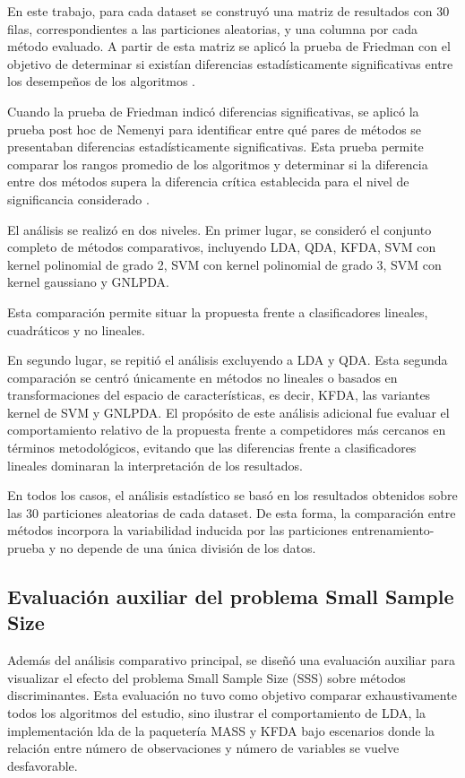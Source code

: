 En este trabajo, para cada dataset se construyó una matriz de resultados con 30 filas, correspondientes a las particiones aleatorias, y una columna por cada método evaluado. A partir de esta matriz se aplicó la prueba de Friedman con el objetivo de determinar si existían diferencias estadísticamente significativas entre los desempeños de los algoritmos \cite{pereira2015overview}.

Cuando la prueba de Friedman indicó diferencias significativas, se aplicó la prueba post hoc de Nemenyi para identificar entre qué pares de métodos se presentaban diferencias estadísticamente significativas. Esta prueba permite comparar los rangos promedio de los algoritmos y determinar si la diferencia entre dos métodos supera la diferencia crítica establecida para el nivel de significancia considerado \cite{demvsar2006statistical}.

El análisis se realizó en dos niveles. En primer lugar, se consideró el conjunto completo de métodos comparativos, incluyendo LDA, QDA, KFDA, SVM con kernel polinomial de grado 2, SVM con kernel polinomial de grado 3, SVM con kernel gaussiano y GNLPDA.

Esta comparación permite situar la propuesta frente a clasificadores lineales, cuadráticos y no lineales.

En segundo lugar, se repitió el análisis excluyendo a LDA y QDA. Esta segunda comparación se centró únicamente en métodos no lineales o basados en transformaciones del espacio de características, es decir, KFDA, las variantes kernel de SVM y GNLPDA. El propósito de este análisis adicional fue evaluar el comportamiento relativo de la propuesta frente a competidores más cercanos en términos metodológicos, evitando que las diferencias frente a clasificadores lineales dominaran la interpretación de los resultados.

En todos los casos, el análisis estadístico se basó en los resultados obtenidos sobre las 30 particiones aleatorias de cada dataset. De esta forma, la comparación entre métodos incorpora la variabilidad inducida por las particiones entrenamiento-prueba y no depende de una única división de los datos.

\subsection{Evaluación auxiliar del problema Small Sample Size}

Además del análisis comparativo principal, se diseñó una evaluación auxiliar para visualizar el efecto del problema Small Sample Size (SSS) sobre métodos discriminantes. Esta evaluación no tuvo como objetivo comparar exhaustivamente todos los algoritmos del estudio, sino ilustrar el comportamiento de LDA, la implementación lda de la paquetería MASS y KFDA bajo escenarios donde la relación entre número de observaciones y número de variables se vuelve desfavorable.

